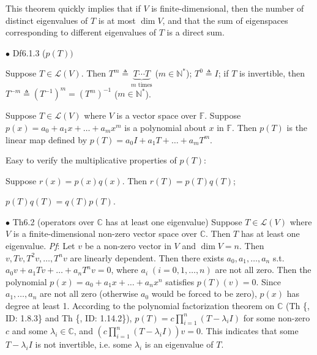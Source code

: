 \documentclass{article}
\begin{document}
\begin{Rmk}{}
    This theorem quickly implies that \textcolor{Th}{if $V$ is finite-dimensional, then the number of distinct eigenvalues of $T$ is at most $\dim V$}, and that \textcolor{Th}{the sum of eigenspaces corresponding to different eigenvalues of $T$ is a direct sum}.
\end{Rmk}

\begin{Df}{$\bullet$ Df6.1.3 ($p(T))$}
    \begin{compactenum}
        \item Suppose $T\in\mathcal{L}(V)$. Then $T^m\triangleq \underbrace{T\cdots T}_{m\text{ times}}$ ($m\in\mathbb{N}^\ast$); $T^0\triangleq I$; if $T$ is invertible, then $T^{-m}\triangleq (T^{-1})^m = (T^m)^{-1}$ ($m\in\mathbb{N}^\ast$).
        \item Suppose $T\in\mathcal{L}(V)$ where $V$ is a vector space over $\mathbb{F}$. Suppose $p(x)=a_0+a_1x+\dots+a_mx^m$ is a polynomial about $x$ in $\mathbb{F}$. Then $p(T)$ is the linear map defined by $p(T)=a_0I+a_1T+\dots+a_mT^m$.
    \end{compactenum}
\end{Df}

\begin{Rmk}{}
    \textcolor{Th}{Easy to verify the multiplicative properties of $p(T)$:}
    \textcolor{Th}{
    \begin{compactitem}
        \item Suppose $r(x) = p(x)q(x)$. Then $r(T) = p(T)q(T)$;
        \item $p(T)q(T) = q(T)p(T)$.
    \end{compactitem}
    }
\end{Rmk}

\begin{Th}{$\bullet$ Th6.2 (operators over $\mathbb{C}$ has at least one eigenvalue)}
    Suppose $T\in\mathcal{L}(V)$ where $V$ is a finite-dimensional non-zero vector space over $\mathbb{C}$. Then $T$ has at least one eigenvalue.
    \tcblower
    \textit{Pf}: Let $v$ be a non-zero vector in $V$ and $\dim V=n$. Then $v, Tv, T^2v, \dots, T^nv$ are linearly dependent. Then there exists $a_0, a_1, \dots, a_n$ s.t. $a_0v+a_1Tv+\dots+a_nT^nv=0$, where $a_i \;(i=0,1,\dots, n)$ are not all zero. Then the polynomial $p(x) = a_0+a_1x+\dots+a_nx^n$ satisfies $p(T)(v) = 0$. Since $a_1, \dots, a_n$ are not all zero (otherwise $a_0$ would be forced to be zero), $p(x)$ has degree at least 1. According to the polynomial factorization theorem on $\mathbb{C}$ (Th \{, ID: 1.8.3\} and Th \{, ID: 1.14.2\}), $p(T) = c\prod_{i=1}^n (T-\lambda_iI)$ for some non-zero $c$ and some $\lambda_i\in\mathbb{C}$, and $\left(c\prod_{i=1}^n (T-\lambda_iI)\right)v = 0$. This indicates that some $T-\lambda_i I$ is not invertible, i.e. some $\lambda_i$ is an eigenvalue of $T$.
\end{Th}
\end{document}
